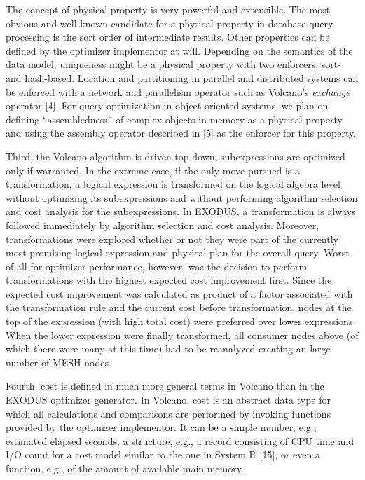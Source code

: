 \documentclass[a4paper,12pt,notitlepage,twoside,openright]{article}
\begin{document}
The concept of physical property is very powerful and extensible. The
most obvious and well-known candidate for a physical property in
database query processing is the sort order of intermediate results.
Other properties can be defined by the optimizer implementor at will.
Depending on the semantics of the data model, uniqueness might be a
physical property with two enforcers, sort- and hash-based. Location and
partitioning in parallel and distributed systems can be enforced with a
network and parallelism operator such as Volcano's \emph{exchange}
operator {[}4{]}. For query optimization in object-oriented systems, we
plan on defining ``assembledness'' of complex objects in memory as a
physical property and using the assembly operator described in {[}5{]}
as the enforcer for this property.

Third, the Volcano algorithm is driven top-down; subexpressions are
optimized only if warranted. In the extreme case, if the only move
pursued is a transformation, a logical expression is transformed on the
logical algebra level without optimizing its subexpressions and without
performing algorithm selection and cost analysis for the subexpressions.
In EXODUS, a transformation is always followed immediately by algorithm
selection and cost analysis. Moreover, transformations were explored
whether or not they were part of the currently most promising logical
expression and physical plan for the overall query. Worst of all for
optimizer performance, however, was the decision to perform
transformations with the highest expected cost improvement first. Since
the expected cost improvement was calculated as product of a factor
associated with the transformation rule and the current cost before
transformation, nodes at the top of the expression (with high total
cost) were preferred over lower expressions. When the lower expression
were finally transformed, all consumer nodes above (of which there were
many at this time) had to be reanalyzed creating an large
number of MESH nodes.

Fourth, cost is defined in much more general terms in Volcano than in
the EXODUS optimizer generator. In Volcano, cost is an abstract data
type for which all calculations and comparisons are performed by
invoking functions provided by the optimizer implementor. It can be a
simple number, e.g., estimated elapsed seconds, a structure, e.g., a
record consisting of CPU time and I/O count for a cost model similar to
the one in System R {[}15{]}, or even a function, e.g., of the amount of
available main memory.
\end{document}
